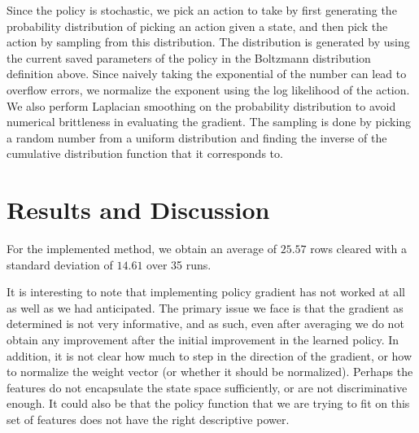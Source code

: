 \documentclass[11pt]{article}
\begin{document}
Since the policy is stochastic, we pick an action to take by first generating the probability distribution of picking an action given a state, and then pick the action by sampling from this distribution. The distribution is generated by using the current saved parameters of the policy in the Boltzmann distribution definition above. Since naively taking the exponential of the number can lead to overflow errors, we normalize the exponent using the log likelihood of the action. We also perform Laplacian smoothing on the probability distribution to avoid numerical brittleness in evaluating the gradient. The sampling is done by picking a random number from a uniform distribution and finding the inverse of the cumulative distribution function that it corresponds to.


\section{Results and Discussion}
For the implemented method, we obtain an average of $25.57$ rows cleared with a standard deviation of $14.61$ over 35 runs.

It is interesting to note that implementing policy gradient has not worked at all as well as we had anticipated. The primary issue we face is that the gradient as determined is not very informative, and as such, even after averaging we do not obtain any improvement after the initial improvement in the learned policy. In addition, it is not clear how much to step in the direction of the gradient, or how to normalize the weight vector (or whether it should be normalized). Perhaps the features do not encapsulate the state space sufficiently, or are not discriminative enough. It could also be that the policy function that we are trying to fit on this set of features does not have the right descriptive power. 
\end{document}

